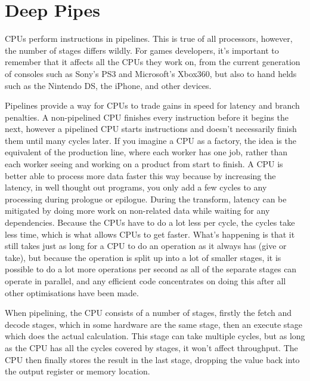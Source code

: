 \section{Deep Pipes}

CPUs perform instructions in pipelines. This is true of all processors,
however, the number of stages differs wildly. For games developers, it's
important to remember that it affects all the CPUs they work on, from the
current generation of consoles such as Sony's PS3 and Microsoft's Xbox360, but
also to hand helds such as the Nintendo DS, the iPhone, and other devices.

Pipelines provide a way for CPUs to trade gains in speed for latency and branch
penalties. A non-pipelined CPU finishes every instruction before it begins the
next, however a pipelined CPU starts instructions and doesn't necessarily
finish them until many cycles later. If you imagine a CPU as a factory, the
idea is the equivalent of the production line, where each worker has one job,
rather than each worker seeing and working on a product from start to finish. A
CPU is better able to process more data faster this way because by increasing
the latency, in well thought out programs, you only add a few cycles to any
processing during prologue or epilogue. During the transform, latency can be
mitigated by doing more work on non-related data while waiting for any
dependencies. Because the CPUs have to do a lot less per cycle, the cycles take
less time, which is what allows CPUs to get faster. What's happening is that it
still takes just as long for a CPU to do an operation as it always has (give or
take), but because the operation is split up into a lot of smaller stages, it
is possible to do a lot more operations per second as all of the separate
stages can operate in parallel, and any efficient code concentrates on doing
this after all other optimisations have been made.

When pipelining, the CPU consists of a number of stages, firstly the fetch and
decode stages, which in some hardware are the same stage, then an execute stage
which does the actual calculation. This stage can take multiple cycles, but as
long as the CPU has all the cycles covered by stages, it won't affect
throughput. The CPU then finally stores the result in the last stage, dropping
the value back into the output register or memory location.

